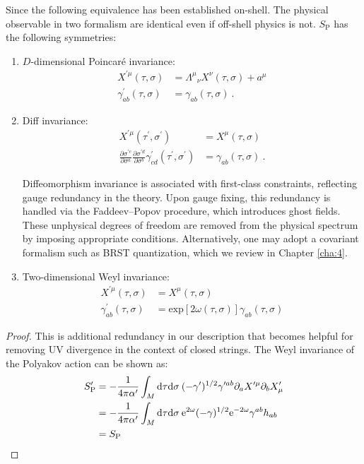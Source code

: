 Since the following equivalence has been established on-shell. The physical observable in two formalism are identical even if off-shell physics is not. $S_{\mathrm{P}}$ has the following symmetries: 
\begin{enumerate}
	\item $D$-dimensional Poincaré invariance: 
	\begin{align}
		X^{\prime \mu}(\tau,\sigma)&={\Lambda^\mu}_\nu X^\nu(\tau,\sigma)+a^\mu \nonumber \\
		\gamma^\prime_{ab}(\tau,\sigma)&=\gamma_{ab}(\tau,\sigma)\:.
	\end{align} 
	\item Diff invariance: 
	\begin{align}
		X^{\prime \mu}(\tau^\prime,\sigma^\prime)&= X^{\mu}(\tau,\sigma)\nonumber \\
		\frac{\partial \sigma^{\prime c}}{\partial \sigma^a}\frac{\partial \sigma^{\prime d}}{\partial \sigma^b}\gamma^\prime_{cd}(\tau^\prime,\sigma^\prime)&=\gamma_{ab}(\tau,\sigma) \:.
	\end{align} 
	\begin{tcolorbox}[breakable]
		\begin{remark}
		Diffeomorphism invariance is associated with first-class constraints, reflecting gauge redundancy in the theory. Upon gauge fixing, this redundancy is handled via the Faddeev–Popov procedure, which introduces ghost fields. These unphysical degrees of freedom are removed from the physical spectrum by imposing appropriate conditions. Alternatively, one may adopt a covariant formalism such as BRST quantization, which we review in Chapter \ref{cha:4}.
		\end{remark}
	\end{tcolorbox}
	\item Two-dimensional Weyl invariance: 
	\begin{align}
		X^{\prime \mu}(\tau,\sigma)&=X^{\mu}(\tau,\sigma)  \nonumber \\
		\gamma^\prime_{ab}(\tau,\sigma)&=\mathrm{exp}[2\omega(\tau,\sigma)]\gamma_{ab}(\tau,\sigma)
	\end{align}
\end{enumerate}
\begin{tcolorbox}[breakable]
	\begin{proof}
		This is additional redundancy in our description that becomes helpful for removing UV divergence in the context of closed strings. The Weyl invariance of the Polyakov action can be shown as:
		\begin{align}
			S^\prime_{\mathrm{P}} &= -\frac{1}{4\pi\alpha^\prime}\int_M \mathrm{d}\tau\mathrm{d}\sigma\: (-\gamma^\prime)^{1/2}\gamma^{\prime ab}\partial_a X^{\prime \mu}\partial_b X^\prime _\mu \nonumber \\
			&= -\frac{1}{4\pi\alpha^\prime}\int_M \mathrm{d}\tau\mathrm{d}\sigma\: \mathrm{e}^{2\omega}(-\gamma)^{1/2}\mathrm{e}^{-2\omega}\gamma^{ab}h_{ab} \nonumber \\
			&= S_{\mathrm{P}} \nonumber
		\end{align}
	\end{proof}
\end{tcolorbox} 
